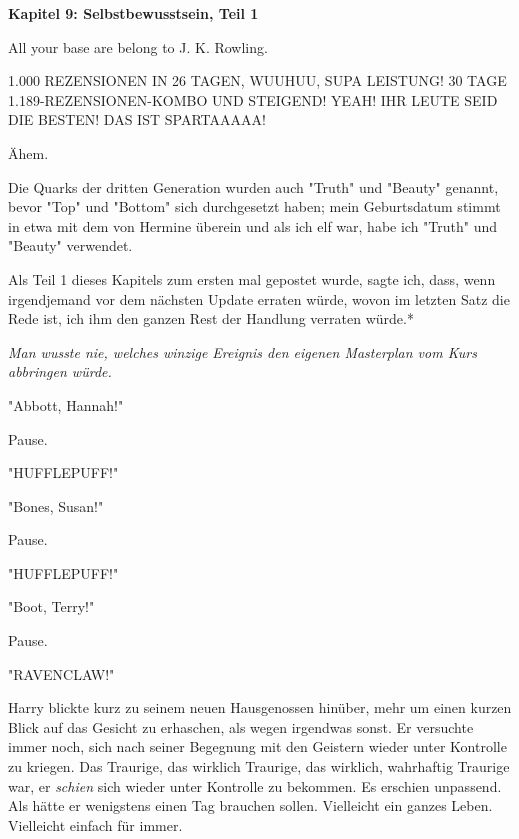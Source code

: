 

\hypertarget{selbstbewusstsein-teil-1}{%

\textbf{Kapitel 9: Selbstbewusstsein, Teil 1}

All your base are belong to J. K. Rowling.

\later

1.000 REZENSIONEN IN 26 TAGEN, WUUHUU, SUPA LEISTUNG! 30 TAGE 1.189-REZENSIONEN-KOMBO UND STEIGEND! YEAH! IHR LEUTE SEID DIE BESTEN! DAS IST SPARTAAAAA!

Ähem.

Die Quarks der dritten Generation wurden auch "Truth" und "Beauty" genannt, bevor "Top" und "Bottom" sich durchgesetzt haben; mein Geburtsdatum stimmt in etwa mit dem von Hermine überein und als ich elf war, habe ich "Truth" und "Beauty" verwendet.

Als Teil 1 dieses Kapitels zum ersten mal gepostet wurde, sagte ich, dass, wenn irgendjemand vor dem nächsten Update erraten würde, wovon im letzten Satz die Rede ist, ich ihm den ganzen Rest der Handlung verraten würde.*

\later

\emph{Man wusste nie, welches winzige Ereignis den eigenen Masterplan vom Kurs abbringen würde.}

\later

"Abbott, Hannah!"

Pause.

"HUFFLEPUFF!"

"Bones, Susan!"

Pause.

"HUFFLEPUFF!"

"Boot, Terry!"

Pause.

"RAVENCLAW!"

Harry blickte kurz zu seinem neuen Hausgenossen hinüber, mehr um einen kurzen Blick auf das Gesicht zu erhaschen, als wegen irgendwas sonst. Er versuchte immer noch, sich nach seiner Begegnung mit den Geistern wieder unter Kontrolle zu kriegen. Das Traurige, das wirklich Traurige, das wirklich, wahrhaftig Traurige war, er \emph{schien} sich wieder unter Kontrolle zu bekommen. Es erschien unpassend. Als hätte er wenigstens einen Tag brauchen sollen. Vielleicht ein ganzes Leben. Vielleicht einfach für immer.

}
